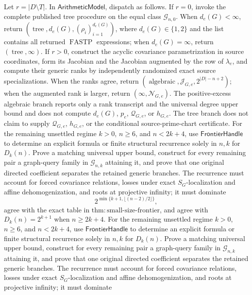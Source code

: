 Let \(r=|D\setminus T|\). In \(\mathsf{ArithmeticModel}\), dispatch as follows. If \(r=0\), invoke the complete published tree procedure on the equal class \(\mathcal G_{n,0}\). When \(d_e(G)<\infty\), return \((\operatorname{tree},d_e(G),(\rho_i)_{i=1}^{d_e(G)})\), where \(d_e(G)\in\{1,2\}\) and the list contains all returned \(\operatorname{FASTP}\) expressions; when \(d_e(G)=\infty\), return \((\operatorname{tree},\infty)\). If \(r>0\), construct the acyclic covariance parametrization in source coordinates, form its Jacobian and the Jacobian augmented by the row of \(\lambda_e\), and compute their generic ranks by independently randomized exact source specializations. When the ranks agree, return \((\operatorname{algebraic},\mathcal J_{G,e},2^{|D|-n+2})\); when the augmented rank is larger, return \((\infty,\mathcal N_{G,e})\). The positive-excess algebraic branch reports only a rank transcript and the universal degree upper bound and does not compute \(d_e(G)\), \(p_e\), \(\mathcal Q_{G,e}\), or \(h_{G,e}\). The tree branch does not claim to supply \(\mathcal Q_{G,e}\), \(h_{G,e}\), or the conditional source-prime-chart certificate.
For the remaining unsettled regime \(k>0\), \(n\geq6\), and \(n<2k+4\), use \(\mathsf{FrontierHandle}\) to determine an explicit formula or finite structural recurrence solely in \(n,k\) for \(D_k(n)\). Prove a matching universal upper bound, construct for every remaining pair a graph-query family in \(\mathcal G_{n,k}\) attaining it, and prove that one original directed coefficient separates the retained generic branches. The recurrence must account for forced covariance relations, losses under exact \(S_G\)-localization and affine dehomogenization, and roots at projective infinity; it must dominate
\[
 2^{\min\{k+1,\lfloor(n-2)/2\rfloor\}},
\]
agree with the exact table in \(\mathrm{thm:small\mbox{-}size\mbox{-}frontier}\), and agree with \(D_k(n)=2^{k+1}\) when \(n\geq2k+4\).
For the remaining unsettled regime \(k>0\), \(n\geq6\), and \(n<2k+4\), use \(\mathsf{FrontierHandle}\) to determine an explicit formula or finite structural recurrence solely in \(n,k\) for \(D_k(n)\). Prove a matching universal upper bound, construct for every remaining pair a graph-query family in \(\mathcal G_{n,k}\) attaining it, and prove that one original directed coefficient separates the retained generic branches. The recurrence must account for forced covariance relations, losses under exact \(S_G\)-localization and affine dehomogenization, and roots at projective infinity; it must dominate
